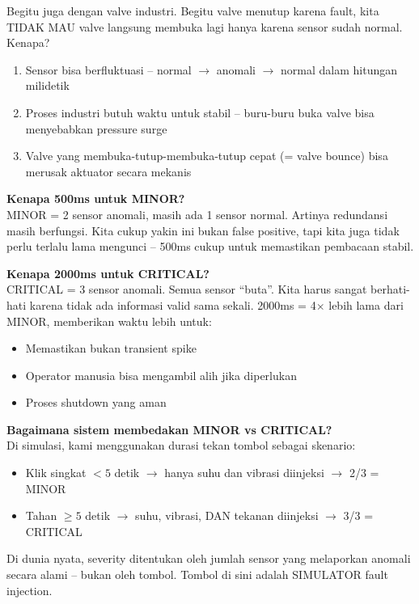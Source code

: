 \documentclass[12pt,a4paper]{article}
\begin{document}
Begitu juga dengan valve industri. Begitu valve menutup karena fault, kita
TIDAK MAU valve langsung membuka lagi hanya karena sensor sudah normal. Kenapa?
\begin{enumerate}[nosep]
    \item Sensor bisa berfluktuasi -- normal $\rightarrow$ anomali $\rightarrow$ normal dalam hitungan milidetik
    \item Proses industri butuh waktu untuk stabil -- buru-buru buka valve bisa
          menyebabkan pressure surge
    \item Valve yang membuka-tutup-membuka-tutup cepat (= valve bounce) bisa merusak
          aktuator secara mekanis
\end{enumerate}

\textbf{Kenapa 500ms untuk MINOR?}\\
MINOR = 2 sensor anomali, masih ada 1 sensor normal. Artinya redundansi masih
berfungsi. Kita cukup yakin ini bukan false positive, tapi kita juga tidak
perlu terlalu lama mengunci -- 500ms cukup untuk memastikan pembacaan stabil.

\textbf{Kenapa 2000ms untuk CRITICAL?}\\
CRITICAL = 3 sensor anomali. Semua sensor ``buta''. Kita harus sangat berhati-hati
karena tidak ada informasi valid sama sekali. 2000ms = 4$\times$ lebih lama dari MINOR,
memberikan waktu lebih untuk:
\begin{itemize}[nosep]
    \item Memastikan bukan transient spike
    \item Operator manusia bisa mengambil alih jika diperlukan
    \item Proses shutdown yang aman
\end{itemize}

\textbf{Bagaimana sistem membedakan MINOR vs CRITICAL?}\\
Di simulasi, kami menggunakan durasi tekan tombol sebagai skenario:
\begin{itemize}[nosep]
    \item Klik singkat $< 5$ detik $\rightarrow$ hanya suhu dan vibrasi diinjeksi $\rightarrow$ 2/3 = MINOR
    \item Tahan $\ge 5$ detik $\rightarrow$ suhu, vibrasi, DAN tekanan diinjeksi $\rightarrow$ 3/3 = CRITICAL
\end{itemize}

Di dunia nyata, severity ditentukan oleh jumlah sensor yang melaporkan anomali
secara alami -- bukan oleh tombol. Tombol di sini adalah SIMULATOR fault injection.
\end{document}
